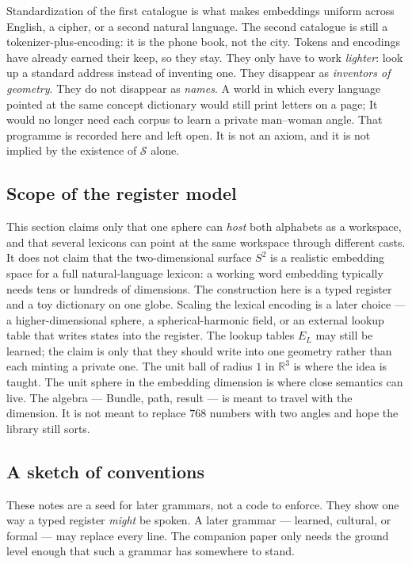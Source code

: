 \documentclass[12pt, a4paper]{article}
\begin{document}
Standardization of the first catalogue is what makes embeddings
uniform across English, a cipher, or a second natural language.
The second catalogue is still a tokenizer-plus-encoding: it is the
phone book, not the city. Tokens and encodings have already earned
their keep, so they stay. They only have to work \emph{lighter}:
look up a standard address instead of inventing one. They disappear as
\emph{inventors of geometry}. They do not disappear as \emph{names}.
A world in which every language pointed at the same concept
dictionary would still print letters on a page; It would no longer need each 
corpus to learn a private $\mathrm{man}$--$\mathrm{woman}$ angle. 
That programme is recorded here and left open. It is not an
axiom, and it is not implied by the existence of $\mathcal{S}$ alone.


\subsection{Scope of the register model}
\label{subsec:register_scope_final}
This section claims only that one sphere can \emph{host} both alphabets
as a workspace, and that several lexicons can point at the same
workspace through different casts. It does not claim that the two-dimensional surface
$S^2$ is a realistic embedding space for a full natural-language
lexicon: a working word embedding typically needs tens or hundreds of
dimensions. The construction here is a typed register and a toy
dictionary on one globe. Scaling the lexical encoding is a later
choice --- a higher-dimensional sphere, a spherical-harmonic field, or
an external lookup table that writes states into the register. The
lookup tables $E_L$ may still be learned; the claim is only that they
should write into one geometry rather than each minting a private one.
The unit ball of radius $1$ in $\mathbb{R}^3$ is where the idea is
taught. The unit sphere in the embedding dimension is where close
semantics can live. The algebra --- Bundle, path, result --- is
meant to travel with the dimension. It is not meant to replace $768$
numbers with two angles and hope the library still sorts.


\subsection{A sketch of conventions}
\label{sec:conventions_sketch}
These notes are a seed for later grammars, not a code to enforce.
They show one way a typed register \emph{might} be spoken. A later
grammar --- learned, cultural, or formal --- may replace every line.
The companion paper only needs the ground level enough that such a grammar has
somewhere to stand.
\end{document}
